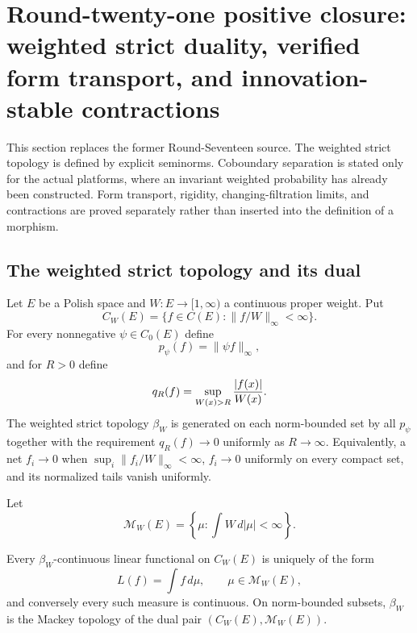 \section{Round-twenty-one positive closure: weighted strict duality, verified form transport, and innovation-stable contractions}
\label{sec:r21-c2}

This section replaces the former Round-Seventeen source.  The weighted strict
topology is defined by explicit seminorms.  Coboundary separation is stated
only for the actual platforms, where an invariant weighted probability has
already been constructed.  Form transport, rigidity, changing-filtration
limits, and contractions are proved separately rather than inserted into the
definition of a morphism.

\subsection{The weighted strict topology and its dual}

Let $E$ be a Polish space and $W:E\to[1,\infty)$ a continuous proper weight.
Put
\[
 C_W(E)=\{f\in C(E):\|f/W\|_\infty<\infty\}.
\]
For every nonnegative $\psi\in C_0(E)$ define
\[
 p_\psi(f)=\|\psi f\|_\infty,
\]
and for $R>0$ define
\[
 q_R(f)=\sup_{W(x)>R}{|f(x)|\over W(x)}.
\]
The weighted strict topology $\beta_W$ is generated on each norm-bounded set
by all $p_\psi$ together with the requirement $q_R(f)\to0$ uniformly as
$R\to\infty$.  Equivalently, a net $f_i\to0$ when
$\sup_i\|f_i/W\|_\infty<\infty$, $f_i\to0$ uniformly on every compact set, and
its normalized tails vanish uniformly.

Let
\[
 \mathcal M_W(E)=\left\{\mu:\int W\,d|\mu|<\infty\right\}.
\]

\begin{theorem}
\label{thm:r21-c2-dual}
Every $\beta_W$-continuous linear functional on $C_W(E)$ is uniquely of the
form
\[
 L(f)=\int f\,d\mu,
 \qquad \mu\in\mathcal M_W(E),
\]
and conversely every such measure is continuous.  On norm-bounded subsets,
$\beta_W$ is the Mackey topology of the dual pair
$(C_W(E),\mathcal M_W(E))$.
\end{theorem}

